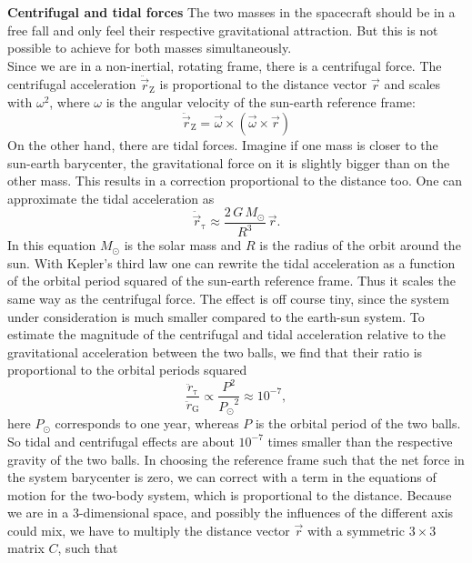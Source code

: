 \documentclass[prb,preprint]{revtex4-1}
\begin{document}
\textbf{Centrifugal and tidal forces}
\label{sec:tidal}
The two masses in the spacecraft should be in a free fall and only feel their respective gravitational attraction. But this is not possible to achieve for both masses simultaneously.\\
Since we are in a non-inertial, rotating frame, there is a centrifugal force. The centrifugal acceleration $\ddot{\vec{r}}_{\mathrm{Z}}$ is proportional to the distance vector $\vec{r}$ and scales with $\omega^2$, where $\omega$ is the angular velocity of the sun-earth reference frame:
\begin{equation}
\label{eq:centrifugalacc}
\ddot{\vec{r}}_{\mathrm{Z}} = \vec{\omega} \times \left( \vec{\omega} \times \vec{r} \right) 
\end{equation}
On the other hand, there are tidal forces. Imagine if one mass is closer to the sun-earth barycenter, the gravitational force on it is slightly bigger than on the other mass. This results in a correction proportional to the distance too. One can approximate the tidal acceleration as
\begin{equation}
\label{eq:tidalacc}
\ddot{\vec{r}}_{\mathrm{\tau}} \approx \frac{2 \, G \, M_\odot}{R^3} \, \vec{r}.
\end{equation}
In this equation $M_\odot$ is the solar mass and $R$ is the radius of the orbit around the sun. With Kepler's third law one can rewrite the tidal acceleration as a function of the orbital period squared of the sun-earth reference frame. Thus it scales the same way as the centrifugal force. The effect is off course tiny, since the system under consideration is much smaller compared to the earth-sun system. To estimate the magnitude of the centrifugal and tidal acceleration relative to the gravitational acceleration between the two balls, we find that their ratio is proportional to the orbital periods squared
\begin{equation}\label{a_ratio}
\frac{\ddot{r}_{\mathrm{\tau}}}{\ddot{r}_\mathrm{G}} \propto \frac{P^2}{{P_\odot}^2} \approx 10^{-7},
\end{equation}
here $P_\odot$ corresponds to one year, whereas $P$ is the orbital period of the two balls. So tidal and centrifugal effects are about $10^{-7}$ times smaller than the respective gravity of the two balls.
In choosing the reference frame such that the net force in the system barycenter is zero, we can correct with a term in the equations of motion for the two-body system, which is proportional to the distance. Because we are in a 3-dimensional space, and possibly the influences of the different axis could mix, we have to multiply the distance vector $\vec{r}$ with a symmetric $3 \times 3$ matrix $C$, such that  
\end{document}
